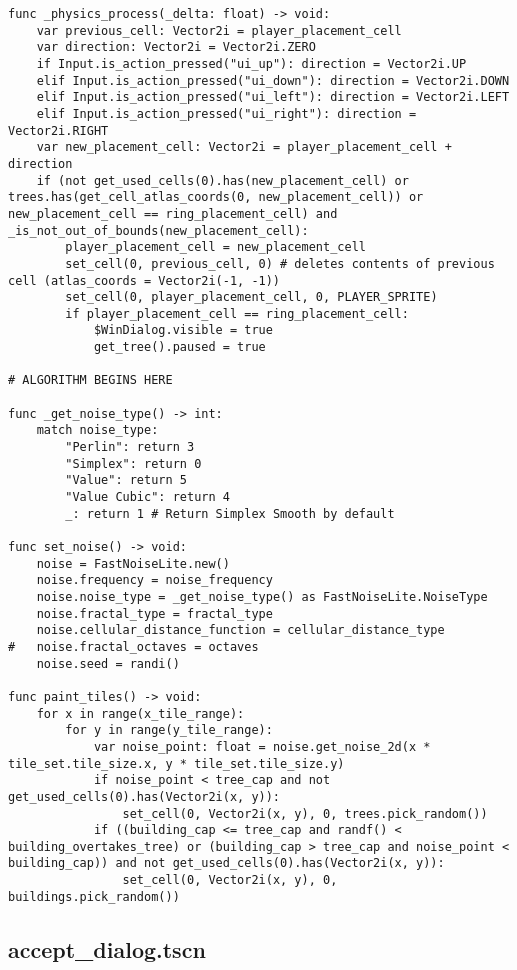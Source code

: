 \begin{lstlisting}
func _physics_process(_delta: float) -> void:
	var previous_cell: Vector2i = player_placement_cell
	var direction: Vector2i = Vector2i.ZERO
	if Input.is_action_pressed("ui_up"): direction = Vector2i.UP
	elif Input.is_action_pressed("ui_down"): direction = Vector2i.DOWN
	elif Input.is_action_pressed("ui_left"): direction = Vector2i.LEFT
	elif Input.is_action_pressed("ui_right"): direction = Vector2i.RIGHT
	var new_placement_cell: Vector2i = player_placement_cell + direction
	if (not get_used_cells(0).has(new_placement_cell) or trees.has(get_cell_atlas_coords(0, new_placement_cell)) or new_placement_cell == ring_placement_cell) and _is_not_out_of_bounds(new_placement_cell):
		player_placement_cell = new_placement_cell
		set_cell(0, previous_cell, 0) # deletes contents of previous cell (atlas_coords = Vector2i(-1, -1))
		set_cell(0, player_placement_cell, 0, PLAYER_SPRITE)
		if player_placement_cell == ring_placement_cell:
			$WinDialog.visible = true
			get_tree().paused = true

# ALGORITHM BEGINS HERE

func _get_noise_type() -> int:
	match noise_type:
		"Perlin": return 3
		"Simplex": return 0
		"Value": return 5
		"Value Cubic": return 4
		_: return 1 # Return Simplex Smooth by default

func set_noise() -> void:
	noise = FastNoiseLite.new()
	noise.frequency = noise_frequency
	noise.noise_type = _get_noise_type() as FastNoiseLite.NoiseType
	noise.fractal_type = fractal_type
	noise.cellular_distance_function = cellular_distance_type
#	noise.fractal_octaves = octaves
	noise.seed = randi()

func paint_tiles() -> void:
	for x in range(x_tile_range):
		for y in range(y_tile_range):
			var noise_point: float = noise.get_noise_2d(x * tile_set.tile_size.x, y * tile_set.tile_size.y)
			if noise_point < tree_cap and not get_used_cells(0).has(Vector2i(x, y)):
				set_cell(0, Vector2i(x, y), 0, trees.pick_random())
			if ((building_cap <= tree_cap and randf() < building_overtakes_tree) or (building_cap > tree_cap and noise_point < building_cap)) and not get_used_cells(0).has(Vector2i(x, y)):
				set_cell(0, Vector2i(x, y), 0, buildings.pick_random())
\end{lstlisting}

\subsection{accept\_dialog.tscn}

